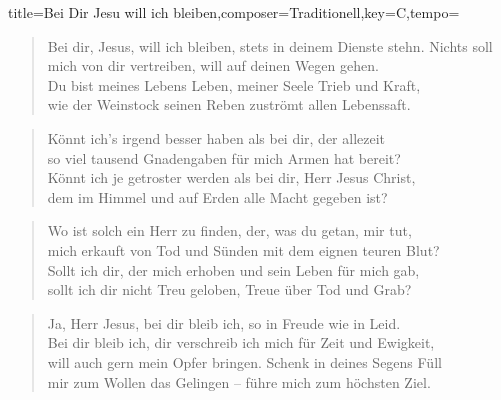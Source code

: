 \documentclass{leadsheet}
\begin{document}
\begin{song}{title={Bei Dir Jesu will ich bleiben},composer={Traditionell},key={C},tempo={}}

\begin{schedule}
\end{schedule}
\begin{verse}
Bei dir, Jesus, will ich bleiben, stets in deinem Dienste stehn.
Nichts soll mich von dir vertreiben, will auf deinen Wegen gehen. \\
Du bist meines Lebens Leben, meiner Seele Trieb und Kraft, \\
wie der Weinstock seinen Reben zuströmt allen Lebenssaft.
\end{verse}
\begin{verse}
Könnt ich's irgend besser haben als bei dir, der allezeit \\
so viel tausend Gnadengaben für mich Armen hat bereit? \\
Könnt ich je getroster werden als bei dir, Herr Jesus Christ, \\
dem im Himmel und auf Erden alle Macht gegeben ist?
\end{verse}
\begin{verse}
Wo ist solch ein Herr zu finden, der, was du getan, mir tut, \\
mich erkauft von Tod und Sünden mit dem eignen teuren Blut? \\
Sollt ich dir, der mich erhoben und sein Leben für mich gab, \\
sollt ich dir nicht Treu geloben, Treue über Tod und Grab?
\end{verse}
\begin{verse}
Ja, Herr Jesus, bei dir bleib ich, so in Freude wie in Leid. \\
Bei dir bleib ich, dir verschreib ich mich für Zeit und Ewigkeit, \\
will auch gern mein Opfer bringen. Schenk in deines Segens Füll \\
mir zum Wollen das Gelingen -- führe mich zum höchsten Ziel. 
\end{verse}

\end{song}
\end{document}
